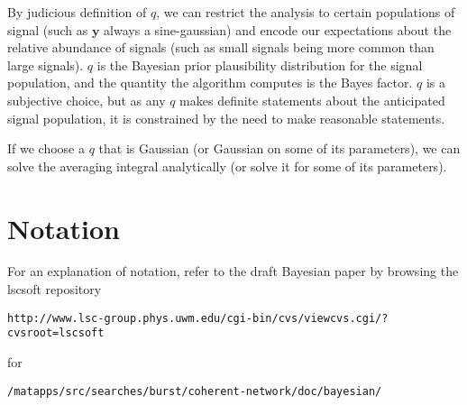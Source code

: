 \documentclass{article}
\begin{document}
By judicious definition of $q$, we can restrict the analysis to certain populations of signal (such as $\mathbf{y}$ always a sine-gaussian) and encode our expectations about the relative abundance of signals (such as small signals being more common than large signals).  $q$ is the Bayesian prior plausibility distribution for the signal population, and the quantity the algorithm computes is the Bayes factor.  $q$ is a subjective choice, but as any $q$ makes definite statements about the anticipated signal population, it is constrained by the need to make reasonable statements.

If we choose a $q$ that is Gaussian (or Gaussian on some of its parameters), we can solve the averaging integral analytically (or solve it for some of its parameters).


\section{Notation}

For an explanation of notation, refer to the draft Bayesian paper by browsing the lscsoft repository

\begin{verbatim}
http://www.lsc-group.phys.uwm.edu/cgi-bin/cvs/viewcvs.cgi/?cvsroot=lscsoft
\end{verbatim}

for

\begin{verbatim}
/matapps/src/searches/burst/coherent-network/doc/bayesian/
\end{verbatim}
\end{document}
